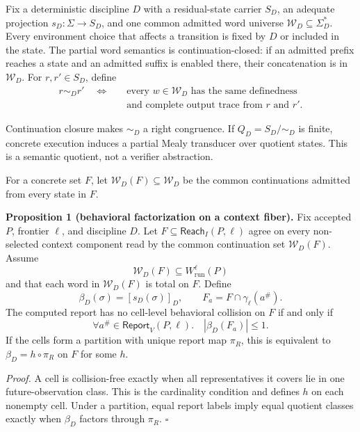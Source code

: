 \documentclass[conference]{IEEEtran}
\begin{document}
Fix a deterministic discipline $D$ with a residual-state carrier $S_D$, an adequate projection $s_D:\Sigma\to S_D$, and one common admitted word universe $\mathcal W_D\subseteq\Sigma_D^*$. Every environment choice that affects a transition is fixed by $D$ or included in the state. The partial word semantics is continuation-closed: if an admitted prefix reaches a state and an admitted suffix is enabled there, their concatenation is in $\mathcal W_D$. For $r,r'\in S_D$, define
\begin{equation}
\begin{split}
r\sim_D r'
\quad\Longleftrightarrow\quad
&\text{every }w\in\mathcal W_D\text{ has the same definedness}\\
&\text{and complete output trace from }r\text{ and }r'.
\end{split}
\end{equation}

Continuation closure makes $\sim_D$ a right congruence. If $Q_D=S_D/{\sim_D}$ is finite, concrete execution induces a partial Mealy transducer over quotient states. This is a semantic quotient, not a verifier abstraction.

For a concrete set $F$, let $\mathcal W_D(F)\subseteq\mathcal W_D$ be the common continuations admitted from every state in $F$.

\medskip
\noindent\textbf{Proposition 1 (behavioral factorization on a context fiber).}
Fix accepted $P$, frontier $\ell$, and discipline $D$. Let $F\subseteq\mathsf{Reach}_I(P,\ell)$ agree on every non-selected context component read by the common continuation set $\mathcal W_D(F)$. Assume
\begin{equation}
\mathcal W_D(F)\subseteq W^\ell_{\mathrm{run}}(P)
\end{equation}
and that each word in $\mathcal W_D(F)$ is total on $F$. Define
\begin{equation}
\beta_D(\sigma)=[s_D(\sigma)]_D,
\qquad
F_a=F\cap\gamma_\ell(a^\#).
\end{equation}
The computed report has no cell-level behavioral collision on $F$ if and only if
\begin{equation}
\forall a^\#\in\mathsf{Report}_V(P,\ell).\quad
|\beta_D(F_a)|\le 1.
\end{equation}
If the cells form a partition with unique report map $\pi_R$, this is equivalent to $\beta_D=h\circ\pi_R$ on $F$ for some $h$.

\emph{Proof.} A cell is collision-free exactly when all representatives it covers lie in one future-observation class. This is the cardinality condition and defines $h$ on each nonempty cell. Under a partition, equal report labels imply equal quotient classes exactly when $\beta_D$ factors through $\pi_R$. \hfill$\square$
\end{document}
